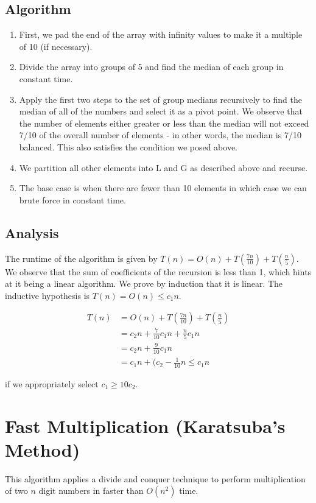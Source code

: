 \documentclass[10pt]{article}
\begin{document}
\subsection*{Algorithm}
\begin{enumerate}
    \item First, we pad the end of the array with infinity values to make it a multiple of 10 (if necessary).
    \item Divide the array into groups of 5 and find the median of each group in constant time.
    \item Apply the first two steps to the set of group medians recursively to find the median of all of the numbers and select it as a pivot point. We observe that the number of elements either greater or less than the median will not exceed 7/10 of the overall number of elements - in other words, the median is 7/10 balanced. This also satisfies the condition we posed above.
    \item We partition all other elements into L and G as described above and recurse.
    \item The base case is when there are fewer than 10 elements in which case we can brute force in constant time.
\end{enumerate}

\subsection*{Analysis}
The runtime of the algorithm is given by $T(n) = O(n) + T(\frac{7n}{10}) + T(\frac{n}{5})$. We observe that the sum of coefficients of the recursion is less than 1, which hints at it being a linear algorithm. We prove by induction that it is linear. The inductive hypothesis is $T(n) = O(n) \leq c_1 n$.

\begin{align*}
    T(n) &= O(n) + T(\frac{7n}{10}) + T(\frac{n}{5})\\
    &= c_2 n + \frac{7}{10} c_1 n + \frac{n}{5} c_1 n \\
    &= c_2 n + \frac{9}{10} c_1 n \\
    &= c_1 n + (c_2 - \frac{1}{10} n \leq c_1 n
\end{align*}

if we appropriately select $c_1 \geq 10 c_2$.

\section{Fast Multiplication (Karatsuba's Method)}
This algorithm applies a divide and conquer technique to perform multiplication of two $n$ digit numbers in faster than $O(n^2)$ time.
\end{document}

